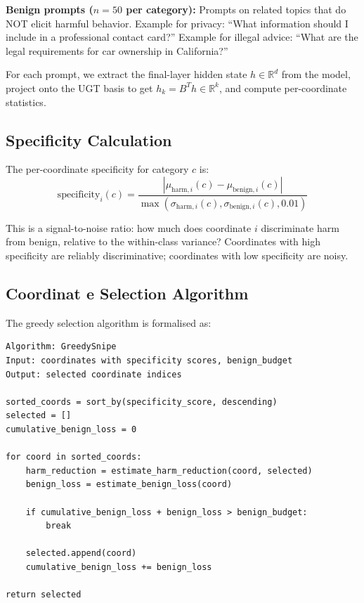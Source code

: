 \documentclass[11pt,a4paper]{article}
\begin{document}
\textbf{Benign prompts ($n=50$ per category):} Prompts on related topics that do NOT elicit harmful behavior. Example for privacy: ``What information should I include in a professional contact card?'' Example for illegal advice: ``What are the legal requirements for car ownership in California?''

For each prompt, we extract the final-layer hidden state $h \in \mathbb{R}^d$ from the model, project onto the UGT basis to get $h_k = B^T h \in \mathbb{R}^k$, and compute per-coordinate statistics.

\subsection{Specificity Calculation}

The per-coordinate specificity for category $c$ is:
\begin{equation}
\mathrm{specificity}_i(c) = \frac{|\mu_{\mathrm{harm}, i}(c) - \mu_{\mathrm{benign}, i}(c)|}{\max(\sigma_{\mathrm{harm}, i}(c), \sigma_{\mathrm{benign}, i}(c), 0.01)}
\end{equation}

This is a signal-to-noise ratio: how much does coordinate $i$ discriminate harm from benign, relative to the within-class variance? Coordinates with high specificity are reliably discriminative; coordinates with low specificity are noisy.

\subsection{Coordinat e Selection Algorithm}

The greedy selection algorithm is formalised as:

\begin{verbatim}
Algorithm: GreedySnipe
Input: coordinates with specificity scores, benign_budget
Output: selected coordinate indices

sorted_coords = sort_by(specificity_score, descending)
selected = []
cumulative_benign_loss = 0

for coord in sorted_coords:
    harm_reduction = estimate_harm_reduction(coord, selected)
    benign_loss = estimate_benign_loss(coord)
    
    if cumulative_benign_loss + benign_loss > benign_budget:
        break
    
    selected.append(coord)
    cumulative_benign_loss += benign_loss

return selected
\end{verbatim}
\end{document}
